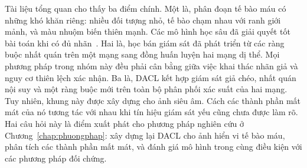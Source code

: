 Tài liệu tổng quan cho thấy ba điểm chính. Một là, phân đoạn tế bào máu có những khó khăn riêng: nhiều đối tượng nhỏ, tế bào chạm nhau với ranh giới mảnh, và màu nhuộm biến thiên mạnh. Các mô hình học sâu đã giải quyết tốt bài toán khi có đủ nhãn~\cite{depto2021blood}. Hai là, học bán giám sát đã phát triển từ các ràng buộc nhất quán trên một mạng sang đồng huấn luyện hai mạng dị thể. Mọi phương pháp trong nhóm này đều phải cân bằng giữa việc khai thác nhãn giả và nguy cơ thiên lệch xác nhận. Ba là, DACL kết hợp giám sát giả chéo, nhất quán nội suy và một ràng buộc mới trên toàn bộ phân phối xác suất của hai mạng. Tuy nhiên, khung này được xây dựng cho ảnh siêu âm. Cách các thành phần mất mát của nó tương tác với nhau khi tín hiệu giám sát yếu cũng chưa được làm rõ. Hai câu hỏi này là điểm xuất phát cho phương pháp nghiên cứu ở Chương~\ref{chap:phuongphap}: xây dựng lại DACL cho ảnh hiển vi tế bào máu, phân tích các thành phần mất mát, và đánh giá mô hình trong cùng điều kiện với các phương pháp đối chứng.
